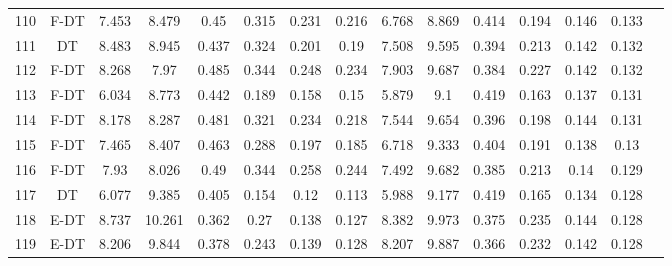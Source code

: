 \begin{longtable}{@{\hskip3pt}c@{\hskip3pt}c@{\hskip3pt}c@{\hskip3pt}c@{\hskip3pt}c@{\hskip3pt}c@{\hskip3pt}c@{\hskip3pt}c@{\hskip3pt}c@{\hskip3pt}c@{\hskip3pt}c@{\hskip3pt}c@{\hskip3pt}c@{\hskip3pt}c@{\hskip3pt}c}
        110 &           F-DT &             7.453 &       8.479 &            0.45 &           0.315 &           0.231 &           0.216 &               6.768 &       8.869 &           0.414 &         0.194 &          0.146 &           0.133 \\
        111 &             DT &             8.483 &       8.945 &           0.437 &           0.324 &           0.201 &            0.19 &               7.508 &       9.595 &           0.394 &         0.213 &          0.142 &           0.132 \\
        112 &           F-DT &             8.268 &        7.97 &           0.485 &           0.344 &           0.248 &           0.234 &               7.903 &       9.687 &           0.384 &         0.227 &          0.142 &           0.132 \\
        113 &           F-DT &             6.034 &       8.773 &           0.442 &           0.189 &           0.158 &            0.15 &               5.879 &         9.1 &           0.419 &         0.163 &          0.137 &           0.131 \\
        114 &           F-DT &             8.178 &       8.287 &           0.481 &           0.321 &           0.234 &           0.218 &               7.544 &       9.654 &           0.396 &         0.198 &          0.144 &           0.131 \\
        115 &           F-DT &             7.465 &       8.407 &           0.463 &           0.288 &           0.197 &           0.185 &               6.718 &       9.333 &           0.404 &         0.191 &          0.138 &            0.13 \\
        116 &           F-DT &              7.93 &       8.026 &            0.49 &           0.344 &           0.258 &           0.244 &               7.492 &       9.682 &           0.385 &         0.213 &           0.14 &           0.129 \\
        117 &             DT &             6.077 &       9.385 &           0.405 &           0.154 &            0.12 &           0.113 &               5.988 &       9.177 &           0.419 &         0.165 &          0.134 &           0.128 \\
        118 &           E-DT &             8.737 &      10.261 &           0.362 &            0.27 &           0.138 &           0.127 &               8.382 &       9.973 &           0.375 &         0.235 &          0.144 &           0.128 \\
        119 &           E-DT &             8.206 &       9.844 &           0.378 &           0.243 &           0.139 &           0.128 &               8.207 &       9.887 &           0.366 &         0.232 &          0.142 &           0.128 \\

\end{longtable}
